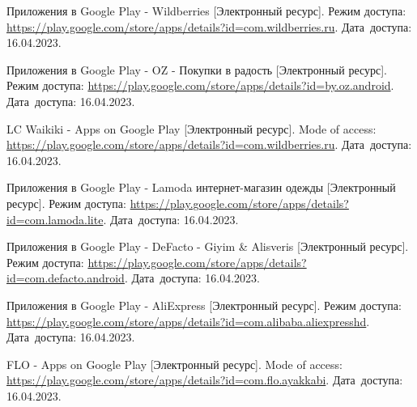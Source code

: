 \begingroup

  \renewcommand{\addcontentsline}[3]{}%
  \renewcommand{\section}[2]{}%

  \begin{thebibliography}{}

    Приложения в Google Play - Wildberries
    [Электронный ресурс].
    Режим доступа: \url{https://play.google.com/store/apps/details?id=com.wildberries.ru}.
    Дата~доступа: 16.04.2023.

    Приложения в Google Play - OZ - Покупки в радость
    [Электронный ресурс].
    Режим доступа: \url{https://play.google.com/store/apps/details?id=by.oz.android}.
    Дата~доступа: 16.04.2023.

    LC Waikiki - Apps on Google Play
    [Электронный ресурс].
    Mode of access: \url{https://play.google.com/store/apps/details?id=com.wildberries.ru}.
    Дата~доступа: 16.04.2023.

    Приложения в Google Play - Lamoda интернет-магазин одежды
    [Электронный ресурс].
    Режим доступа: \url{https://play.google.com/store/apps/details?id=com.lamoda.lite}.
    Дата~доступа: 16.04.2023.

    Приложения в Google Play - DeFacto - Giyim \& Alisveris %
    [Электронный ресурс].
    Режим доступа: \url{https://play.google.com/store/apps/details?id=com.defacto.android}.
    Дата~доступа: 16.04.2023.

    Приложения в Google Play - AliExpress
    [Электронный ресурс].
    Режим доступа: \url{https://play.google.com/store/apps/details?id=com.alibaba.aliexpresshd}.
    Дата~доступа: 16.04.2023.

    FLO - Apps on Google Play
    [Электронный ресурс].
    Mode of access: \url{https://play.google.com/store/apps/details?id=com.flo.ayakkabi}.
    Дата~доступа: 16.04.2023.


\end{thebibliography}
